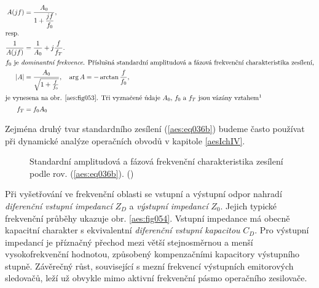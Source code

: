         \begin{subequations}\label{aes:eq036}
          \begin{align}
            A(jf)   &= \dfrac{A_0}{1 + \dfrac{jf}{f_0}},                  \label{aes:eq036a}  \\
            \shortintertext{resp.}   
            \dfrac{1}{A(jf)} &=  \dfrac{1}{A_0} + j\dfrac{f}{f_T}.        \label{aes:eq036b}  \\
            \shortintertext{\(f_0\) je \emph{dominantní frekvence}. Příslušná standardní amplitudová 
                            a fázová frekvenční charakteristika zesílení,}
            \abs{A} &= \dfrac{A_0}{\sqrt{1 + \frac{f}{f_0}}}, \quad 
                      \arg{A} = - \arctan\dfrac{f}{f_0},                  \label{aes:eq036c}  \\ 
            \shortintertext{je vynesena na obr. \ref{aes:fig053}. Tři vyznačené údaje \(A_0\), 
                            \(f_0\) a \(f_T\) jsou vázány vztahem\footnotemark}
            f_T &= f_0A_0                                                 \label{aes:eq036d}
          \end{align}
        \end{subequations}

        Zejména druhý tvar standardního zesílení (\ref{aes:eq036b}) budeme často používat při
        dynamické analýze operačních obvodů v kapitole \ref{aesIchIV}.

        \begin{figure}[ht!] %
          \centering
          \caption{Standardní amplitudová a fázová frekvenční charakteristika zesílení podle rov.
                  (\ref{aes:eq036b}). (\cite[s.~25]{Dostal})}
          \label{aes:fig053}
        \end{figure}  

        Při vyšetřování ve frekvenční oblasti se vstupní a výstupní odpor nahradí \emph{diferenční
        vstupní impedancí} \(Z_D\) a \emph{výstupní impedancí} \(Z_0\). Jejich typické frekvenční
        průběhy ukazuje obr. \ref{aes:fig054}. Vstupní impedance má obecně kapacitní charakter s
        ekvivalentní \emph{diferenční vstupní kapacitou} \(C_D\). Pro výstupní impedancí je
        příznačný přechod mezi větší stejnosměrnou a menší vysokofrekvenční hodnotou, způsobený
        kompenzačními kapacitory výstupního stupně. Závěrečný růst, související s mezní frekvencí
        výstupních emitorových sledovačů, leží už obvykle mimo aktivní frekvenční pásmo operačního
        zesilovače.

